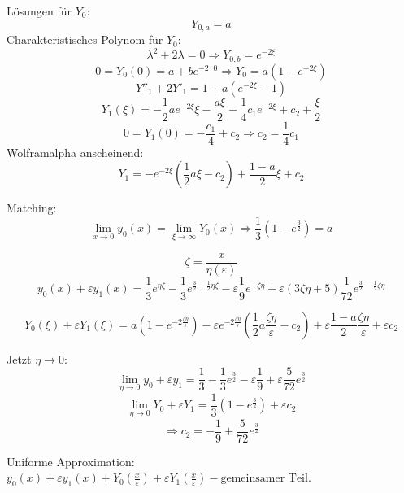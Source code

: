 \documentclass[a4paper,11pt]{scrartcl}
\newcommand*{\eps}{\varepsilon}
\begin{document}
\begin{enumerate}[label*=\textbf{8.\arabic*.}]
\begin{enumerate}
    Lösungen für $Y_0$:
    \[ Y_{0, a} = a\]
    Charakteristisches Polynom für $Y_0$:
    \[\lambda^2 + 2 \lambda = 0 \Rightarrow Y_{0, b} = e^{-2\xi}\]
    \[0 = Y_0(0) = a + b e^{-2 \cdot 0} \Rightarrow Y_0 = a (1 - e^{-2\xi}) \]
    \[Y''_1 + 2 Y'_1 = 1 + a (e^{-2 \xi} - 1)\]
    \[Y_1(\xi) = -\frac{1}{2} a e^{-2\xi} \xi - \frac{a\xi}{2} -\frac{1}{4} c_1
      e^{-2 \xi} + c_2 + \frac{\xi}{2} \]
    \[0= Y_1(0) = -\frac{c_1}{4} + c_2 \Rightarrow c_2 = \frac{1}{4} c_1\]
    Wolframalpha anscheinend:
    \[Y_1 = -e^{-2\xi} \left(\frac{1}{2}a \xi - c_2\right) + \frac{1-a}{2} \xi
      + c_2\]

    Matching:
    \[\lim_{x\rightarrow 0} y_0(x) = \lim_{\xi \rightarrow \infty} Y_0(x)
      \Rightarrow \frac{1}{3}( 1 -e^{\frac{3}{2}}) = a\]

    \[\zeta = \frac{x}{\eta(\eps)}\]
    \[y_0(x) + \eps y_1(x) = \frac{1}{3} e^{\eta\zeta} - \frac{1}{3}
      e^{\frac{3}{2} - \frac{1}{2}\eta\zeta} - \eps \frac{1}{9} e^{-\zeta
        \eta}+ \eps(3 \zeta \eta + 5) \frac{1}{72} e^{\frac{3}{2} - \frac{1}{2}
        \zeta \eta}\]

    \[Y_0(\xi)+\eps Y_1(\xi) = a (1 - e^{-2 \frac{\zeta \eta}{\eps}}) - \eps
      e^{-2\frac{\zeta \eta}{\eps}} \left( \frac{1}{2} a \frac{\zeta \eta}{\eps}
      - c_2 \right) + \eps \frac{1 - a}{2}\frac{\zeta\eta}{\eps} + \eps c_2   \]

  Jetzt $\eta \rightarrow 0$:
  \[\lim_{\eta \rightarrow 0} y_0 + \eps y_1 = \frac{1}{3} - \frac{1}{3}
  e^{\frac{3}{2}} - \eps \frac{1}{9} + \eps \frac{5}{72} e^{\frac{3}{2}}\]
  \[\lim_{\eta\rightarrow 0}Y_0 + \eps Y_1 = \frac{1}{3} (1 - e^{\frac{3}{2}})
    + \eps c_2\]
  \[\Rightarrow c_2 = -\frac{1}{9} + \frac{5}{72} e^{\frac{3}{2}}\]

  Uniforme Approximation: $y_0(x) + \eps y_1(x) + Y_0(\frac{x}{\eps}) + \eps
  Y_1(\frac{x}{\eps}) - \text{gemeinsamer Teil}$.






\end{enumerate}
\end{enumerate}
\end{document}
